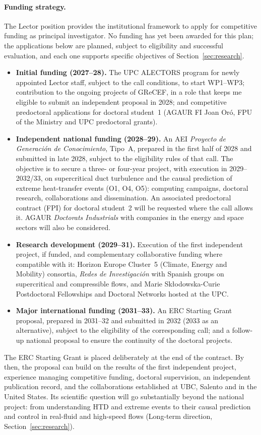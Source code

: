 \documentclass[11pt]{article}
\begin{document}
\paragraph{Funding strategy.} The Lector position provides the institutional framework to
apply for competitive funding as principal investigator. No funding has yet been awarded for
this plan; the applications below are planned, subject to eligibility and successful
evaluation, and each one supports specific objectives of Section~\ref{sec:research}.
\begin{itemize}
  \item \textbf{Initial funding (2027--28).} The UPC ALECTORS program for newly appointed
  Lector staff, subject to the call conditions, to start WP1--WP3; contribution to the
  ongoing projects of GReCEF, in a role that keeps me eligible to submit an independent
  proposal in 2028; and competitive predoctoral applications for doctoral student~1 (AGAUR
  FI Joan Or\'o, FPU of the Ministry and UPC predoctoral grants).
  \item \textbf{Independent national funding (2028--29).} An AEI \emph{Proyecto de
  Generaci\'on de Conocimiento}, Tipo~A, prepared in the first half of 2028 and submitted in
  late 2028, subject to the eligibility rules of that call. The objective is to secure a three-
  or four-year project, with execution in 2029--2032/33, on supercritical duct turbulence and
  the causal prediction of extreme heat-transfer events (O1, O4, O5): computing campaigns,
  doctoral research, collaborations and dissemination. An associated predoctoral contract
  (FPI) for doctoral student~2 will be requested where the call allows it. AGAUR
  \emph{Doctorats Industrials} with companies in the energy and space sectors will also be
  considered.
  \item \textbf{Research development (2029--31).} Execution of the first independent project,
  if funded, and complementary collaborative funding where compatible with it: Horizon
  Europe Cluster~5 (Climate, Energy and Mobility) consortia, \emph{Redes de Investigaci\'on}
  with Spanish groups on supercritical and compressible flows, and Marie
  Sk\l{}odowska-Curie Postdoctoral Fellowships and Doctoral Networks hosted at the UPC.
  \item \textbf{Major international funding (2031--33).} An ERC Starting Grant proposal,
  prepared in 2031--32 and submitted in 2032 (2033 as an alternative), subject to the
  eligibility of the corresponding call; and a follow-up national proposal to ensure the
  continuity of the doctoral projects.
\end{itemize}
The ERC Starting Grant is placed deliberately at the end of the contract. By then, the
proposal can build on the results of the first independent project, experience managing
competitive funding, doctoral supervision, an independent publication record, and the
collaborations established at UBC, Salento and in the United States. Its scientific question
will go substantially beyond the national project: from understanding HTD and extreme events
to their causal prediction and control in real-fluid and high-speed flows (Long-term
direction, Section~\ref{sec:research}).
\end{document}
